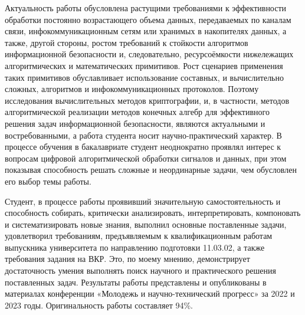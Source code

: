 \documentclass[ {{barchelor thesis review}} ]{fefudoc}
\begin{document}
\Actuality
Актуальность работы обусловлена растущими требованиями к эффективности обработки постоянно возрастающего объема данных, передаваемых по каналам связи, инфокоммуникационным сетям или хранимых в накопителях данных, а также, другой стороны, ростом требований к стойкости алгоритмов информационной безопасности и, следовательно, ресурсоёмкости нижележащих алгоритмических и математических примитивов. Рост сценариев применения таких примитивов обуславливает использование составных, и вычислительно сложных, алгоритмов и инфокоммуникационных протоколов. Поэтому исследования вычислительных методов криптографии, и, в частности, методов алгоритмической реализации методов конечных алгебр для эффективного решения задач информационной безопасности, являются актуальными и востребованными, а работа студента носит научно-практический характер. В процессе обучения в бакалавриате студент неоднократно проявлял интерес к вопросам цифровой алгоритмической обработки сигналов и данных, при этом показывая способность решать сложные и неординарные задачи, чем обусловлен его выбор темы работы.

\WorkingProcess
Студент, в процессе работы проявивший значительную самостоятельность и способность собирать, критически анализировать, интерпретировать, компоновать и систематизировать новые знания, выполнил основные поставленные задачи, удовлетворил требованиям, предъявляемым к квалификационным работам выпускника университета по направлению подготовки 11.03.02, а также требования задания на ВКР. Это, по моему мнению, демонстрирует достаточность умения выполнять поиск научного и практического решения поставленных задач. Результаты работы представлены и опубликованы в материалах конференции «Молодежь и научно-технический прогресс» за 2022 и 2023 годы. Оригинальность работы составляет 94\%.


\Defendable[да]


\Recomendations
\RecomendedForScience
\RecomendedForPublication
\RecomendedForFurtherEducation
\end{document}
